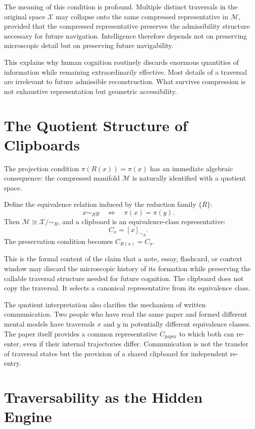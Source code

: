 \documentclass[12pt,oneside]{book}
\theoremstyle{plain}
\theoremstyle{definition}
\theoremstyle{plain}
\newcommand{\cM}{\mathcal{M}}
\newcommand{\cX}{\mathcal{X}}
\begin{document}
The meaning of this condition is profound. Multiple distinct traversals in the original space $\cX$ may collapse onto the same compressed representative in $\cM$, provided that the compressed representative preserves the admissibility structure necessary for future navigation. Intelligence therefore depends not on preserving microscopic detail but on preserving future navigability.

This explains why human cognition routinely discards enormous quantities of information while remaining extraordinarily effective. Most details of a traversal are irrelevant to future admissible reconstruction. What survives compression is not exhaustive representation but geometric accessibility.

\section{The Quotient Structure of Clipboards}

The projection condition $\pi(R(x)) = \pi(x)$ has an immediate algebraic consequence: the compressed manifold $\cM$ is naturally identified with a quotient space.

Define the equivalence relation induced by the reduction family $\{R\}$:
\[
x \sim_R y \quad\Longleftrightarrow\quad \pi(x) = \pi(y).
\]
Then $\cM \cong \cX / {\sim_R}$, and a clipboard is an equivalence-class representative:
\[
C_x = [x]_{\sim_R}.
\]
The preservation condition becomes $C_{R(x)} = C_x$.

This is the formal content of the claim that a note, essay, flashcard, or context window may discard the microscopic history of its formation while preserving the callable traversal structure needed for future cognition. The clipboard does not copy the traversal. It selects a canonical representative from its equivalence class.

The quotient interpretation also clarifies the mechanism of written communication. Two people who have read the same paper and formed different mental models have traversals $x$ and $y$ in potentially different equivalence classes. The paper itself provides a common representative $C_{\text{paper}}$ to which both can re-enter, even if their internal trajectories differ. Communication is not the transfer of traversal states but the provision of a shared clipboard for independent re-entry.

\section{Traversability as the Hidden Engine}
\end{document}
